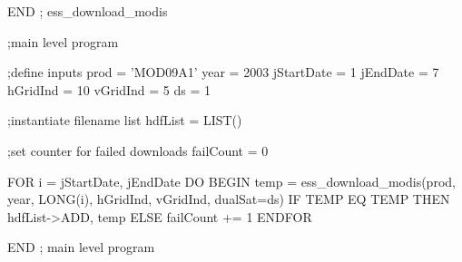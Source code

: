 \documentclass{book}
\newcommand{\codefill}{\centering$\longrightarrow$\hfill{\color{gray}\rule[0.1\baselineskip]{0.5\linewidth}{2pt}}\hfill$\longleftarrow$}
\theoremstyle{aside_style}
\begin{document}
\begin{idl}
END ; ess_download_modis

;main level program

;define inputs
prod = 'MOD09A1'
year = 2003
jStartDate = 1
jEndDate = 7
hGridInd = 10
vGridInd = 5
ds = 1


;instantiate filename list
hdfList = LIST()

;set counter for failed downloads
failCount = 0

FOR i = jStartDate, jEndDate DO BEGIN
    temp = ess_download_modis(prod, year, LONG(i), hGridInd, vGridInd, dualSat=ds)
    IF TEMP EQ TEMP THEN hdfList->ADD, temp ELSE failCount += 1
ENDFOR

END ; main level program
\end{idl}
\end{document}
